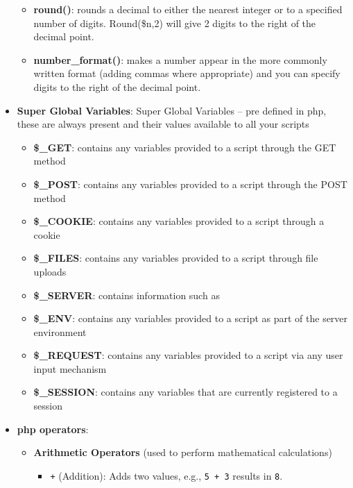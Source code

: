 \documentclass{report}
\begin{document}
\begin{itemize}
            \begin{itemize}
                \item \textbf{round()}: rounds a decimal to either the nearest integer or to a specified number of digits. Round(\$n,2) will give 2 digits to the right of the decimal point.
                \item \textbf{number\_format()}: makes a number appear in the more commonly written format (adding commas where appropriate) and you can specify digits to the right of the decimal point.
            \end{itemize}
        \item \textbf{Super Global Variables}: Super Global Variables – pre defined in php, these are always present and their values available to all your scripts
            \begin{itemize}
                \item \textbf{\$\_GET}: contains any variables provided to a script through the GET method
                \item \textbf{\$\_POST}: contains any variables provided to a script through the POST method
                \item \textbf{\$\_COOKIE}: contains any variables provided to a script through a cookie
                \item \textbf{\$\_FILES}: contains any variables provided to a script through file uploads
                \item \textbf{\$\_SERVER}: contains information such as
                \item \textbf{\$\_ENV}: contains any variables provided to a script as part of the server environment
                \item \textbf{\$\_REQUEST}: contains any variables provided to a script via any user input mechanism
                \item \textbf{\$\_SESSION}: contains any variables that are currently registered to a session
            \end{itemize}
        \item \textbf{php operators}: 
            \begin{itemize}
                \item \textbf{Arithmetic Operators} (used to perform mathematical calculations)
                    \begin{itemize}
                        \item \texttt{+} (Addition): Adds two values, e.g., \texttt{5 + 3} results in \texttt{8}.

\end{itemize}
\end{itemize}
\end{itemize}
\end{document}
